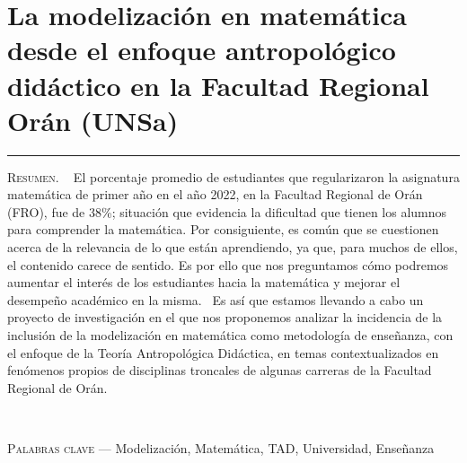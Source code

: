 \thispagestyle{portadapage}
\setcounter{subsection}{0}
\setcounter{subsubsection}{0}
\setcounter{actividad}{0}
\setcounter{actividad_previa}{0}
\setcounter{actividad_entre}{0}
\renewcommand{\articulotipo}{Comunicación breve}
\renewcommand{\articulotitulo}{La modelización en matemática desde el enfoque antropológico didáctico en la Facultad Regional Orán (UNSa)}
\renewcommand{\articulotitulocorto}{La modelización en matemática desde el enfoque antropológico didáctico en la Facultad Regional Orán (UNSa)}
\section{\articulotitulo}

\noindent\rule{\linewidth}{2pt}

\vspace{0.25cm}

\begin{flushright}
	\vspace{1em}
\end{flushright}

\vspace{0.5cm}

\begin{center}
	\begin{minipage}{0.75\linewidth} \small
		\textsc{Resumen}. ~
		El porcentaje promedio de estudiantes que regularizaron la asignatura matemática de primer año en el año 2022, en la Facultad Regional de Orán (FRO), fue de 38\%; situación que evidencia la dificultad que tienen los alumnos para comprender la matemática. Por consiguiente, es común que se cuestionen acerca de la relevancia de lo que están aprendiendo, ya que, para muchos de ellos, el contenido carece de sentido. Es por ello que nos preguntamos cómo podremos aumentar el interés de los estudiantes hacia la matemática y mejorar el desempeño académico en la misma.  Es así que estamos llevando a cabo un proyecto de investigación en el que nos proponemos analizar la incidencia de la inclusión de la modelización en matemática como metodología de enseñanza, con el enfoque de la Teoría Antropológica Didáctica, en temas contextualizados en fenómenos propios de disciplinas troncales de algunas carreras de la Facultad Regional de Orán.
	\end{minipage}\\
	
	\vspace{0.5em}
	
	\begin{minipage}{0.75\linewidth} \small
		\textsc{Palabras clave} --- Modelización, Matemática, TAD, Universidad, Enseñanza
	\end{minipage}
\end{center}

